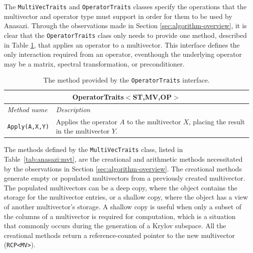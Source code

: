 \documentclass[acmtoms]{acmtrans2m}
\newcounter{algorithm}
\newcommand{\aspace}[1]{\texttt{#1}}
\begin{document}
The \aspace{MultiVecTraits} and \aspace{OperatorTraits} classes specify
the operations that the multivector and operator type must support in order for them to be
used by Anasazi. Through the observations made in Section \ref{sec:algorithm-overview}, 
it is clear that the \aspace{OperatorTraits} class only needs to provide one method,
described in Table \ref{tab:anasazi:opt}, that applies an operator to a multivector.  
This interface defines the only interaction required from an operator, eventhough
the underlying operator may be a matrix, 
spectral transformation, or preconditioner.
\begin{table}[bth]
\begin{center}
  \caption{The method provided by the \aspace{OperatorTraits} interface.}
\label{tab:anasazi:opt}
\begin{tabular}{| p{4cm} | p{8cm} |}
\hline
\multicolumn{2}{|c|}{\textbf{OperatorTraits$<$ST,MV,OP$>$}} \\\hline
\emph{Method name} & \emph{Description} \\\hline
{\tt Apply(A,X,Y)} & Applies the operator $A$ to the multivector $X$, placing the
result in the multivector $Y$. \\
\hline
\end{tabular}
\end{center}
\end{table}

The methods defined by the \aspace{MultiVecTraits} class, listed in
Table~\ref{tab:anasazi:mvt}, are the creational and arithmetic methods necessitated
by the observations in Section \ref{sec:algorithm-overview}.
The creational methods generate empty or populated multivectors from a previously
created multivector. The populated multivectors can be 
a deep copy, where the object contains the storage for the multivector entries, or a shallow copy, 
where the object has a view of another multivector's storage.
A shallow copy is useful when only a
subset of the columns of a multivector is required for computation, which is a situation that 
commonly occurs during the generation of a Krylov subspace. All the creational methods return
a reference-counted pointer \cite{Detlefs:1992:GCR,Teuchos-RCP} to the new multivector (\aspace{RCP<MV>}). 

\end{document}
